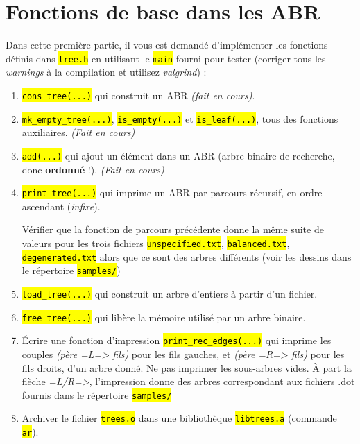 \documentclass[final, pdftex, a4paper, openbib, ]{article}
\let\OldTexttt\texttt
\renewcommand{\texttt}[1]{\OldTexttt{\hl{#1}}}
\begin{document}
\section{Fonctions de base dans les ABR}
Dans cette première partie, il vous est demandé d'implémenter les fonctions définis dans \texttt{tree.h} en utilisant le \texttt{main} fourni pour tester (corriger tous les \textit{warnings} à la compilation et utilisez \textit{valgrind}) :

\begin{enumerate}
	\item \texttt{cons_tree(...)} qui construit un ABR \textit{(fait en cours)}.
	
	\item \texttt{mk_empty_tree(...)}, \texttt{is_empty(...)} et \texttt{is_leaf(...)}, tous des fonctions auxiliaires. \textit{(Fait en cours)}
	
	\item \texttt{add(...)} qui ajout un élément dans un ABR (arbre binaire de recherche, donc \textbf{ordonné} !). \textit{(Fait en cours)}
	
	\item \texttt{print_tree(...)} qui imprime un ABR par parcours récursif, en ordre ascendant (\textit{infixe}).
	
	Vérifier que la fonction de parcours précédente donne la même suite de valeurs pour les trois fichiers \texttt{unspecified.txt}, \texttt{balanced.txt}, \texttt{degenerated.txt} alors que ce sont des arbres différents (voir les dessins dans le répertoire \texttt{samples/})
	
	\item \texttt{load_tree(...)} qui construit un arbre d'entiers à partir d'un fichier.
	\item \texttt{free_tree(...)} qui libère la mémoire utilisé par un arbre binaire.
	
	\item Écrire une fonction d'impression \texttt{print_rec_edges(...)} qui imprime les couples \textit{(père =L=> fils)} pour les fils gauches, et \textit{(père =R=> fils)} pour les fils droits, d'un arbre donné. Ne pas imprimer les sous-arbres vides.
	À part la flèche \textit{=L/R=>}, l'impression donne des arbres correspondant aux fichiers .dot fournis dans le répertoire \texttt{samples/}
	
	\item Archiver le fichier \texttt{trees.o} dans une bibliothèque \texttt{libtrees.a} (commande \texttt{ar}).
\end{enumerate}
\end{document}
